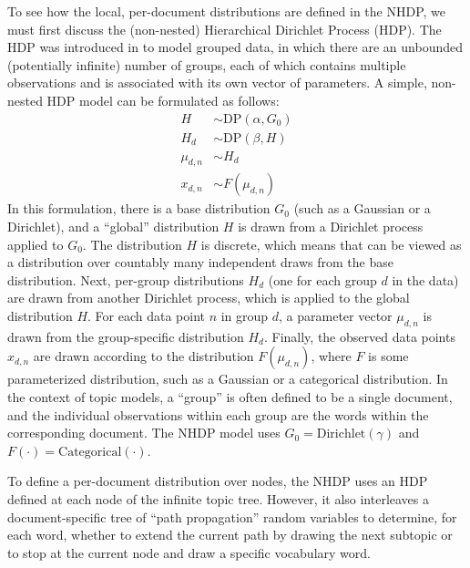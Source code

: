 \documentclass{article}
\begin{document}
To see how the local, per-document distributions are defined in the NHDP, we must first discuss the (non-nested) Hierarchical Dirichlet Process (HDP).
The HDP was introduced in \cite{teh2005hdp} to model grouped data, in which there are an unbounded (potentially infinite) number of groups, each of which contains multiple observations and is associated with its own vector of parameters.
A simple, non-nested HDP model can be formulated as follows:
\begin{align}
H &\sim \text{DP}(\alpha, G_0) \\
H_d &\sim \text{DP}(\beta, H) \\
\mu_{d,n} &\sim H_d \\
x_{d,n} &\sim F(\mu_{d,n})
\end{align}
In this formulation, there is a base distribution $G_0$ (such as a Gaussian or a Dirichlet), and a ``global'' distribution $H$ is drawn from a Dirichlet process applied to $G_0$.
The distribution $H$ is discrete, which means that can be viewed as a distribution over countably many independent draws from the base distribution.
Next, per-group distributions $H_d$ (one for each group $d$ in the data) are drawn from another Dirichlet process, which is applied to the global distribution $H$.
For each data point $n$ in group $d$, a parameter vector $\mu_{d,n}$ is drawn from the group-specific distribution $H_d$.
Finally, the observed data points $x_{d,n}$ are drawn according to the distribution $F(\mu_{d,n})$, where $F$ is some parameterized distribution, such as a Gaussian or a categorical distribution.
In the context of topic models, a ``group'' is often defined to be a single document, and the individual observations within each group are the words within the corresponding document.
The NHDP model uses $G_0 = \text{Dirichlet}(\gamma)$ and $F(\cdot) = \text{Categorical}(\cdot)$.

To define a per-document distribution over nodes, the NHDP uses an HDP defined at each node of the infinite topic tree.
However, it also interleaves a document-specific tree of ``path propagation'' random variables to determine, for each word, whether to extend the current path by drawing the next subtopic or to stop at the current node and draw a specific vocabulary word.
\end{document}
